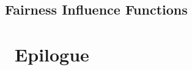 	\chapter{Fairness Influence Functions}				
	
	
	
	
		

	
	


	\part{~Epilogue}
	
	\printbibliography[heading=bibintoc]


\appendix


